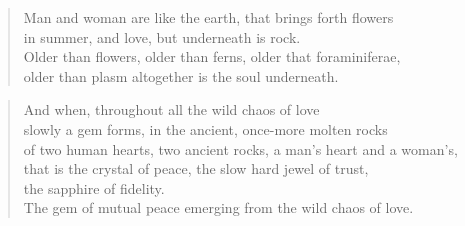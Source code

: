 \begin{verse}
Man and woman are like the earth, that brings forth flowers\\
in summer, and love, but underneath is rock.\\
Older than flowers, older than ferns, older that foraminiferae,\\
older than plasm altogether is the soul underneath.\\
\end{verse}
\begin{verse}
And when, throughout all the wild chaos of love\\
slowly a gem forms, in the ancient, once-more molten rocks\\
of two human hearts, two ancient rocks, a man's heart and a woman's,\\
that is the crystal of peace, the slow hard jewel of trust,\\
the sapphire of fidelity.\\
The gem of mutual peace emerging from the wild chaos of love.\\
\end{verse}
